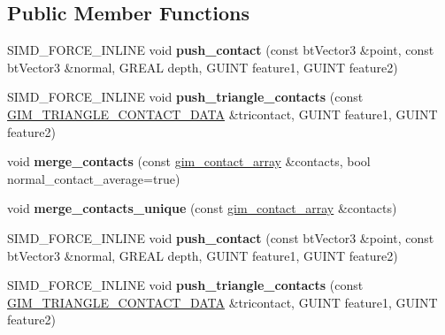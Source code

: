 \subsection*{Public Member Functions}
\begin{DoxyCompactItemize}
\item 
\mbox{\label{classgim__contact__array_aa35384cf722e52dad7e9966b8c5624f4}} 
S\+I\+M\+D\+\_\+\+F\+O\+R\+C\+E\+\_\+\+I\+N\+L\+I\+NE void {\bfseries push\+\_\+contact} (const bt\+Vector3 \&point, const bt\+Vector3 \&normal, G\+R\+E\+AL depth, G\+U\+I\+NT feature1, G\+U\+I\+NT feature2)
\item 
\mbox{\label{classgim__contact__array_aaf165fe754942e9f157b39d7db181d60}} 
S\+I\+M\+D\+\_\+\+F\+O\+R\+C\+E\+\_\+\+I\+N\+L\+I\+NE void {\bfseries push\+\_\+triangle\+\_\+contacts} (const \hyperlink{structGIM__TRIANGLE__CONTACT__DATA}{G\+I\+M\+\_\+\+T\+R\+I\+A\+N\+G\+L\+E\+\_\+\+C\+O\+N\+T\+A\+C\+T\+\_\+\+D\+A\+TA} \&tricontact, G\+U\+I\+NT feature1, G\+U\+I\+NT feature2)
\item 
\mbox{\label{classgim__contact__array_a74bc3c96a4552559f250df1528afae99}} 
void {\bfseries merge\+\_\+contacts} (const \hyperlink{classgim__contact__array}{gim\+\_\+contact\+\_\+array} \&contacts, bool normal\+\_\+contact\+\_\+average=true)
\item 
\mbox{\label{classgim__contact__array_ac72ddf0ededc37e0bbf8bdb0fa2f406c}} 
void {\bfseries merge\+\_\+contacts\+\_\+unique} (const \hyperlink{classgim__contact__array}{gim\+\_\+contact\+\_\+array} \&contacts)
\item 
\mbox{\label{classgim__contact__array_aa35384cf722e52dad7e9966b8c5624f4}} 
S\+I\+M\+D\+\_\+\+F\+O\+R\+C\+E\+\_\+\+I\+N\+L\+I\+NE void {\bfseries push\+\_\+contact} (const bt\+Vector3 \&point, const bt\+Vector3 \&normal, G\+R\+E\+AL depth, G\+U\+I\+NT feature1, G\+U\+I\+NT feature2)
\item 
\mbox{\label{classgim__contact__array_aaf165fe754942e9f157b39d7db181d60}} 
S\+I\+M\+D\+\_\+\+F\+O\+R\+C\+E\+\_\+\+I\+N\+L\+I\+NE void {\bfseries push\+\_\+triangle\+\_\+contacts} (const \hyperlink{structGIM__TRIANGLE__CONTACT__DATA}{G\+I\+M\+\_\+\+T\+R\+I\+A\+N\+G\+L\+E\+\_\+\+C\+O\+N\+T\+A\+C\+T\+\_\+\+D\+A\+TA} \&tricontact, G\+U\+I\+NT feature1, G\+U\+I\+NT feature2)

\end{DoxyCompactItemize}
